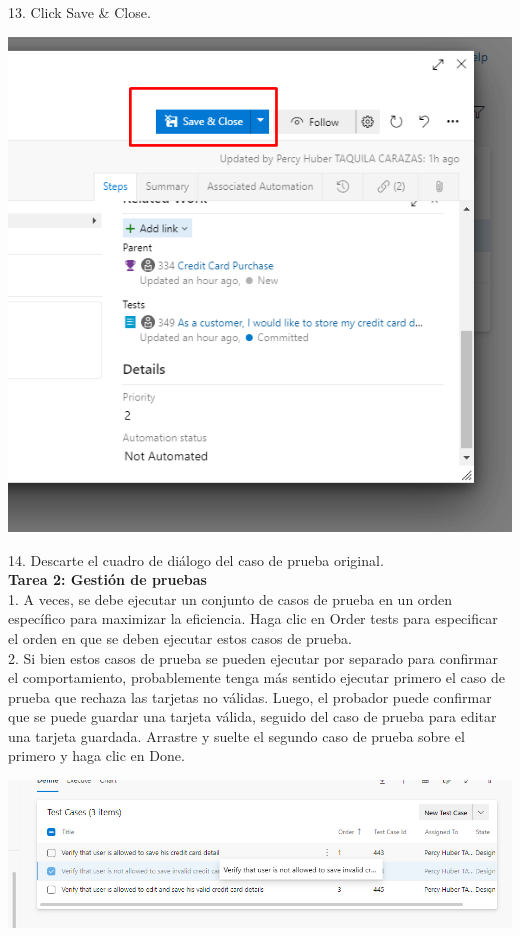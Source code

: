 \documentclass[12pt,letterpaper]{article}
\begin{document}
13. Click Save \& Close.

\begin{center}
		\includegraphics[width=15cm]{./Imagenes/12} 
\end{center}

14. Descarte el cuadro de diálogo del caso de prueba original.\\

\textbf{Tarea 2: Gestión de pruebas}\\

1. A veces, se debe ejecutar un conjunto de casos de prueba en un orden específico para maximizar la eficiencia. Haga clic en Order tests para especificar el orden en que se deben ejecutar estos casos de prueba.\\

2. Si bien estos casos de prueba se pueden ejecutar por separado para confirmar el comportamiento, probablemente tenga más sentido ejecutar primero el caso de prueba que rechaza las tarjetas no válidas. Luego, el probador puede confirmar que se puede guardar una tarjeta válida, seguido del caso de prueba para editar una tarjeta guardada. Arrastre y suelte el segundo caso de prueba sobre el primero y haga clic en Done.

\begin{center}
		\includegraphics[width=15cm]{./Imagenes/13} 
\end{center}
\end{document}
